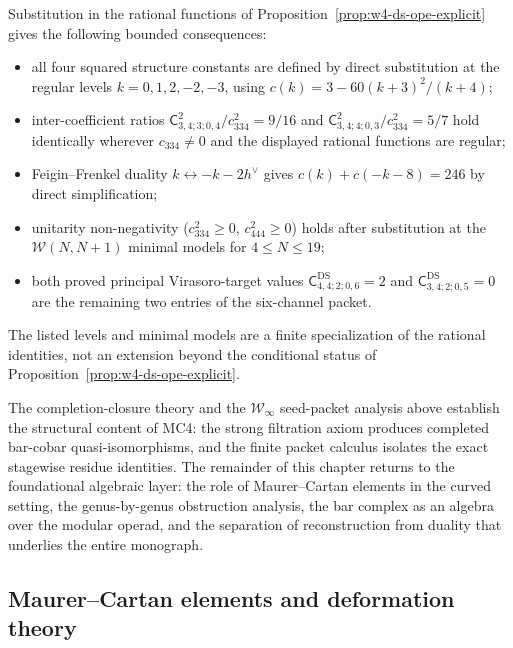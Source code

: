 \begin{computation}
\label{comp:w4-ds-ope-extraction}
Substitution in the rational functions of
Proposition~\ref{prop:w4-ds-ope-explicit} gives the following bounded
consequences:
\begin{itemize}
\item all four squared structure constants are defined by direct
 substitution at the regular levels $k = 0, 1, 2, -2, -3$, using
 $c(k)=3-60(k+3)^2/(k+4)$;
\item inter-coefficient ratios
 $\mathsf{C}_{3,4;3;0,4}^2/c_{334}^2 = 9/16$ and
 $\mathsf{C}_{3,4;4;0,3}^2/c_{334}^2 = 5/7$ hold identically wherever
 $c_{334}\neq0$ and the displayed rational functions are regular;
\item Feigin--Frenkel duality $k \leftrightarrow -k-2h^\vee$
 gives $c(k) + c(-k-8) = 246$ by direct simplification;
\item unitarity non-negativity ($c_{334}^2 \geq 0$, $c_{444}^2 \geq 0$)
 holds after substitution at the $\mathcal{W}(N, N{+}1)$ minimal models
 for $4 \leq N \leq 19$;
\item both proved principal Virasoro-target values
 $\mathsf{C}^{\mathrm{DS}}_{4,4;2;0,6} = 2$ and
 $\mathsf{C}^{\mathrm{DS}}_{3,4;2;0,5} = 0$ are the remaining two
 entries of the six-channel packet.
\end{itemize}
The listed levels and minimal models are a finite specialization of the
rational identities, not an extension beyond the conditional status of
Proposition~\ref{prop:w4-ds-ope-explicit}.
\end{computation}

The completion-closure theory and the $\mathcal{W}_\infty$ seed-packet
analysis above establish the structural content of MC4: the strong
filtration axiom produces completed bar-cobar quasi-isomorphisms,
and the finite packet calculus isolates the exact stagewise residue
identities. The remainder of this chapter returns
to the foundational algebraic layer: the role of Maurer--Cartan
elements in the curved setting, the genus-by-genus obstruction
analysis, the bar complex as an algebra over the modular operad, and
the separation of reconstruction from duality that underlies the
entire monograph.

\subsection{Maurer--Cartan elements and deformation theory}
\label{sec:maurer-cartan-curved}

